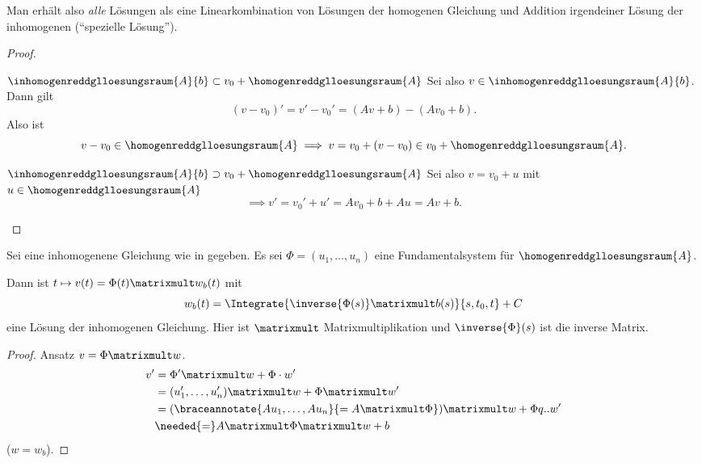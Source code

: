 \begin{bemerkung*}
  Man erhält also \emph{alle} Lösungen als eine Linearkombination von Lösungen der homogenen Gleichung und Addition irgendeiner Lösung der inhomogenen (\enquote{spezielle Lösung}).
\end{bemerkung*}
\begin{proof}
  \begin{proofdescription}
    \item[\( \inhomogenreddglloesungsraum{A}{b}\subset v_0+\homogenreddglloesungsraum{A} \)]
    Sei also \( v\in \inhomogenreddglloesungsraum{A}{b} \). Dann gilt 
    \begin{equation*}
      (v-v_0)'=v'-v_0'=(Av+b)-(Av_0+b).
    \end{equation*}
    Also ist
    \begin{equation*}
      v-v_0\in \homogenreddglloesungsraum{A}\implies v=v_0+(v-v_0)\in v_0+\homogenreddglloesungsraum{A}.
    \end{equation*}
    \item[\( \inhomogenreddglloesungsraum{A}{b}\supset v_0+\homogenreddglloesungsraum{A} \)] Sei also \( v=v_0+u \) mit \( u\in \homogenreddglloesungsraum{A} \)
    \begin{equation*}
      \implies v'=v_0'+u'=A v_0+b+Au=Av+b.
    \end{equation*}
  \end{proofdescription}
\end{proof}
\begin{lemma}\label{variation_der_konstanten_die_zweite}
  Sei eine inhomogenene Gleichung wie in  gegeben. Es sei \( \Phi=(u_1,\dotsc,u_n) \) eine Fundamentalsystem für \( \homogenreddglloesungsraum{A} \).

  Dann ist \( t\mapsto v(t)=\Phi(t)\matrixmult w_b(t) \) mit
  \begin{equation*}
    w_b(t)=\Integrate{\inverse{\Phi(s)}\matrixmult b(s)}{s,t_0,t}+C
  \end{equation*}
  eine Lösung der inhomogenen Gleichung. Hier ist \( \matrixmult \) Matrixmultiplikation und \( \inverse{\Phi}(s) \) ist die inverse Matrix.
\end{lemma}
\begin{proof}
  Ansatz \( v=\Phi\matrixmult w \).
  \begin{align*}
    v'&=\Phi'\matrixmult w+ \Phi\cdot w'\\
    &=(u_1',\dotsc,u_n')\matrixmult w+\Phi\matrixmult w'\\
    &=(\braceannotate{Au_1,\dotsc, Au_n}{=A\matrixmult \Phi})\matrixmult w+\Phi q..
     w'\\
    &\needed{=}A\matrixmult \Phi\matrixmult w+b
  \end{align*}
  \timplies \Beh (\( w=w_b \)).
  
\end{proof}
